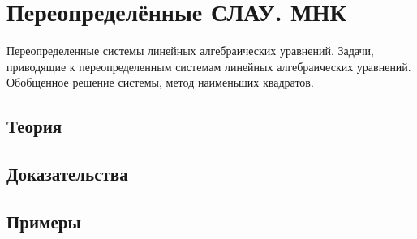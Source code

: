 
\section{Переопределённые СЛАУ. МНК}
\label{sec:2.1.07-overdetermined-lsq}

\begin{ticket}
Переопределенные системы линейных алгебраических уравнений. Задачи, приводящие к переопределенным системам линейных алгебраических уравнений. Обобщенное решение системы, метод наименьших квадратов.
\end{ticket}

\subsection*{Теория}

\subsection*{Доказательства}

\subsection*{Примеры}
